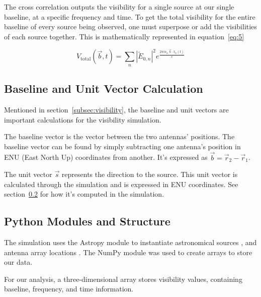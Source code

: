 \documentclass[12pt]{article}
\begin{document}
The cross correlation outputs the visibility for a single source at our single baseline, at a specific frequency and time. To get the total visibility for the entire baseline of every source being observed, one must superpose or add the visibilities of each source together. This is mathematically represented in equation~\ref{eq:5}


\begin{equation}
V_{\text{total}}(\vec{b}, t) =
\sum_{n} |\tilde{E}_{0,n} | ^2
e^{\frac{2 \pi i \nu_n \, \vec{b} \cdot \hat{s}_n(t)}{c}}
\label{eq:5}
\end{equation}

\subsection{Baseline and Unit Vector Calculation}
\label{subsec:vectors}

Mentioned in section~\ref{subsec:visibility}, the baseline and unit vectors are important calculations for the visibility simulation. 

The baseline vector is the vector between the two antennas' positions. The baseline vector can be found by simply subtracting one antenna's position in ENU (East North Up) coordinates from another. It's expressed as $\vec{b} = \vec{r}_2 - \vec{r}_1$.

The unit vector ${\vec{s}}$ represents the direction to the source. This unit vector is calculated through the simulation and is expressed in ENU coordinates. See section~\ref{subsec:python} for how it's computed in the simulation. 

\subsection{Python Modules and Structure}
\label{subsec:python}
The simulation uses the Astropy module to instantiate astronomical sources \cite{[5]}, and antenna array locations \cite{[6]}. The NumPy module was used to create arrays \cite{[7]} to store our data. 

For our analysis, a three-dimensional array stores visibility values, containing baseline, frequency, and time information. 
\end{document}
